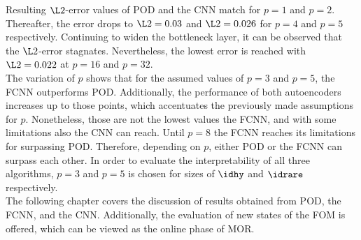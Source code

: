 Resulting \(\L2\)-error values of POD and the CNN match for \(p=1\) and \(p=2\). Thereafter, the error drops to \(\L2=0.03\) and \(\L2=0.026\) for \(p=4\) and \(p=5\) respectively. Continuing to widen the bottleneck layer, it can be observed that the \(\L2\)-error stagnates. Nevertheless, the lowest error is reached with \(\L2=0.022\) at \(p=16\) and \(p=32\).\\
The variation of \(p\) shows that for the assumed values of \(p=3\) and \(p=5\), the FCNN outperforms POD. Additionally, the performance of both autoencoders increases up to those points, which accentuates the previously made assumptions for \(p\). Nonetheless, those are not the lowest values the FCNN, and with some limitations also the CNN can reach. Until \(p=8\) the FCNN reaches its limitations for surpassing POD. Therefore, depending on \(p\), either POD or the FCNN can surpass each other. In order to evaluate the interpretability of all three algorithms, \(p=3\) and \(p=5\) is chosen for sizes of \(\idhy\) and \(\idrare\) respectively.\\

The following chapter covers the discussion of results obtained from POD, the FCNN, and the CNN. Additionally, the evaluation of new states of the FOM is offered, which can be viewed as the online phase of MOR. 
